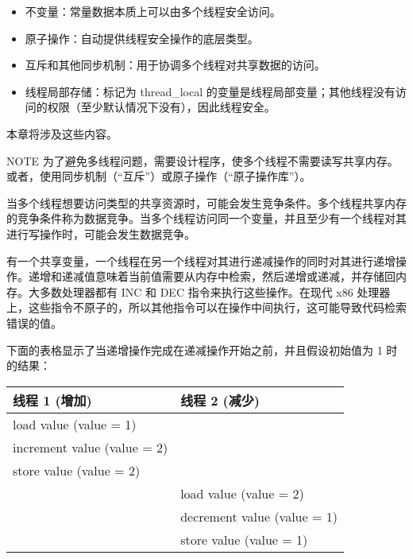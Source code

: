 \begin{itemize}
\item
不变量：常量数据本质上可以由多个线程安全访问。

\item
原子操作：自动提供线程安全操作的底层类型。

\item
互斥和其他同步机制：用于协调多个线程对共享数据的访问。

\item
线程局部存储：标记为 thread\_local 的变量是线程局部变量；其他线程没有访问的权限（至少默认情况下没有），因此线程安全。
\end{itemize}

本章将涉及这些内容。

\begin{myNotic}{NOTE}
为了避免多线程问题，需要设计程序，使多个线程不需要读写共享内存。或者，使用同步机制（“互斥”）或原子操作（“原子操作库”）。
\end{myNotic}


当多个线程想要访问类型的共享资源时，可能会发生竞争条件。多个线程共享内存的竞争条件称为数据竞争。当多个线程访问同一个变量，并且至少有一个线程对其进行写操作时，可能会发生数据竞争。

有一个共享变量，一个线程在另一个线程对其进行递减操作的同时对其进行递增操作。递增和递减值意味着当前值需要从内存中检索，然后递增或递减，并存储回内存。大多数处理器都有 INC 和 DEC 指令来执行这些操作。在现代 x86 处理器上，这些指令不原子的，所以其他指令可以在操作中间执行，这可能导致代码检索错误的值。

下面的表格显示了当递增操作完成在递减操作开始之前，并且假设初始值为 1 时的结果：

\begin{longtable}{|l|l|}
\hline
\textbf{线程 1 (增加)} & \textbf{线程 2 (减少)} \\ \hline
\endfirsthead
%
\endhead
%
load value (value = 1)        &                               \\ \hline
increment value (value = 2)   &                               \\ \hline
store value (value = 2)       &                               \\ \hline
& load value (value = 2)        \\ \hline
& decrement value (value = 1)   \\ \hline
& store value (value = 1)       \\ \hline
\end{longtable}

